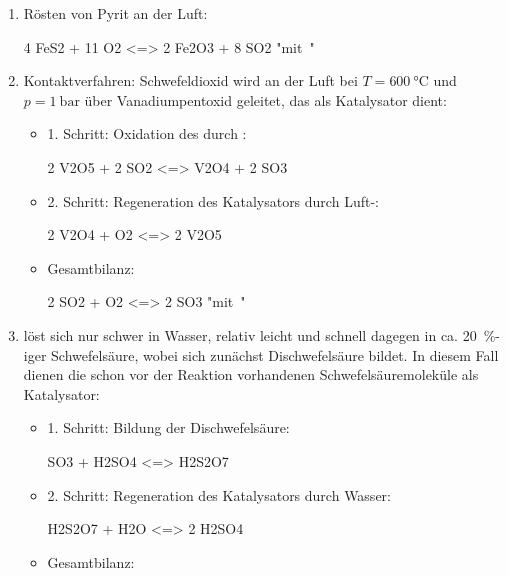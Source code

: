 \documentclass[DIV11]{scrartcl}
\begin{document}
\begin{question}[name=Technische Schwefelsäuresynthese]
\begin{enumerate}[label=\arabic*.]
  \item Rösten von Pyrit  an der Luft:
    \begin{reaction*}
      4 FeS2 + 11 O2 <=> 2 Fe2O3 + 8 SO2 \qquad{} "mit~"
    \end{reaction*}
  \item Kontaktverfahren: Schwefeldioxid wird an der Luft bei $T =
    \SI{600}{\celsius}$ und $p = \SI{1}{\bar}$ über Vanadiumpentoxid 
    geleitet, das als Katalysator dient:
    \begin{itemize}
      \item 1. Schritt: Oxidation des  durch :
        \begin{reaction*}
          2 V2O5 + 2 SO2 <=> V2O4 + 2 SO3
        \end{reaction*}
      \item 2. Schritt: Regeneration des Katalysators durch Luft-:
        \begin{reaction*}
          2 V2O4 + O2 <=> 2 V2O5
        \end{reaction*}
      \item Gesamtbilanz:
        \begin{reaction*}
          2 SO2 + O2 <=> 2 SO3 \qquad{} "mit~"
        \end{reaction*}
    \end{itemize}
  \item {} löst sich nur schwer in Wasser, relativ leicht und schnell
    dagegen in ca. \SI{20}{\percent}-iger Schwefelsäure, wobei sich zunächst
    Dischwefelsäure  bildet.  In diesem Fall dienen die schon vor
    der Reaktion vorhandenen Schwefelsäuremoleküle als Katalysator:
    \begin{itemize}
     \item 1. Schritt: Bildung der Dischwefelsäure:
       \begin{reaction*}
         SO3 + H2SO4 <=> H2S2O7
       \end{reaction*}
     \item 2. Schritt: Regeneration des Katalysators durch Wasser:
       \begin{reaction*}
         H2S2O7 + H2O <=> 2 H2SO4
       \end{reaction*}
     \item Gesamtbilanz:
       \begin{reaction*}

\end{reaction*}
\end{itemize}
\end{enumerate}
\end{question}
\end{document}
